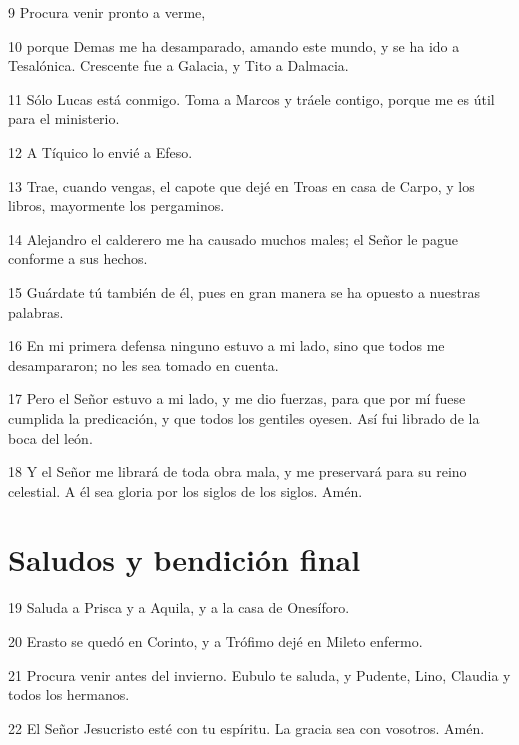 \par 9 Procura venir pronto a verme,
\par 10 porque Demas me ha desamparado, amando este mundo, y se ha ido a Tesalónica. Crescente fue a Galacia, y Tito a Dalmacia.
\par 11 Sólo Lucas está conmigo. Toma a Marcos y tráele contigo, porque me es útil para el ministerio.
\par 12 A Tíquico lo envié a Efeso.
\par 13 Trae, cuando vengas, el capote que dejé en Troas en casa de Carpo, y los libros, mayormente los pergaminos.
\par 14 Alejandro el calderero me ha causado muchos males; el Señor le pague conforme a sus hechos.
\par 15 Guárdate tú también de él, pues en gran manera se ha opuesto a nuestras palabras.
\par 16 En mi primera defensa ninguno estuvo a mi lado, sino que todos me desampararon; no les sea tomado en cuenta.
\par 17 Pero el Señor estuvo a mi lado, y me dio fuerzas, para que por mí fuese cumplida la predicación, y que todos los gentiles oyesen. Así fui librado de la boca del león.
\par 18 Y el Señor me librará de toda obra mala, y me preservará para su reino celestial. A él sea gloria por los siglos de los siglos. Amén.

\section*{Saludos y bendición final}

\par 19 Saluda a Prisca y a Aquila, y a la casa de Onesíforo.
\par 20 Erasto se quedó en Corinto, y a Trófimo dejé en Mileto enfermo.
\par 21 Procura venir antes del invierno. Eubulo te saluda, y Pudente, Lino, Claudia y todos los hermanos.
\par 22 El Señor Jesucristo esté con tu espíritu. La gracia sea con vosotros. Amén.

